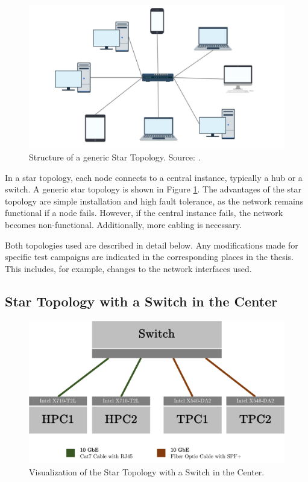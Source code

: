 \begin{figure}[h]
    \centering
    \includegraphics[width=0.6\linewidth]{figures/method/topo1.png}
    \caption[Structure of a generic Star Topology]{Structure of a generic Star Topology. Source: \cite{topo01}.}
    \label{fig:startopoGeneral}
\end{figure}

In a star topology, each node connects to a central instance, typically a hub or a switch. A generic star topology is shown in Figure \ref{fig:startopoGeneral}. The advantages of the star topology are simple installation and high fault tolerance, as the network remains functional if a node fails. However, if the central instance fails, the network becomes non-functional. Additionally, more cabling is necessary.

Both topologies used are described in detail below. Any modifications made for specific test campaigns are indicated in the corresponding places in the thesis. This includes, for example, changes to the network interfaces used.

\subsection{Star Topology with a Switch in the Center} \label{chap:TopoSwitch}

\begin{figure}[h]
    \centering
    \includegraphics[width=1\linewidth]{figures/method/topo2.pdf}
    \caption[Visualization of the Star Topology with a Switch in the Center]{Visualization of the Star Topology with a Switch in the Center.}
    \label{fig:startopoSwitch}
\end{figure}

